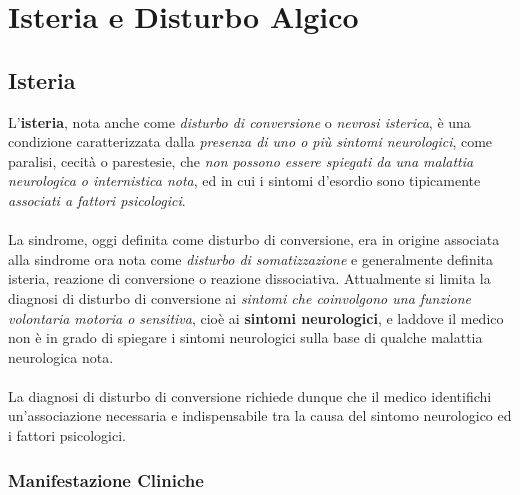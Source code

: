 \section{Isteria e Disturbo Algico}

\subsection{Isteria}

L'\textbf{isteria}, nota anche come \emph{disturbo di conversione} o
\emph{nevrosi isterica}, è una condizione caratterizzata dalla
\emph{presenza di uno o più sintomi neurologici}, come paralisi, cecità
o parestesie, che \emph{non possono essere spiegati da una malattia
neurologica o internistica nota}, ed in cui i sintomi d'esordio sono
tipicamente \emph{associati a fattori psicologici}.
\\\\
La sindrome, oggi definita come disturbo di conversione, era in origine
associata alla sindrome ora nota come \emph{disturbo di somatizzazione}
e generalmente definita isteria, reazione di conversione o reazione
dissociativa. Attualmente si limita la diagnosi di disturbo di
conversione ai \emph{sintomi che coinvolgono una funzione volontaria
motoria o sensitiva}, cioè ai \textbf{sintomi neurologici}, e laddove il
medico non è in grado di spiegare i sintomi neurologici sulla base di
qualche malattia neurologica nota.
\\\\
La diagnosi di disturbo di conversione richiede dunque che il medico
identifichi un'associazione necessaria e indispensabile tra la causa del
sintomo neurologico ed i fattori psicologici.

\subsubsection{Manifestazione Cliniche}

